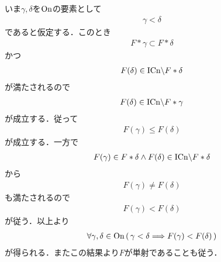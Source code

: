 	\begin{prf}
		いま$\gamma,\delta$を$\mathrm{On}$の要素として
		\begin{align}
			\gamma < \delta
		\end{align}
		であると仮定する．このとき
		\begin{align}
			F \ast \gamma \subset F \ast \delta
		\end{align}
		かつ
		\begin{align}
			F(\delta) \in \mathrm{ICn} \backslash F \ast \delta
		\end{align}
		が満たされるので
		\begin{align}
			F(\delta) \in \mathrm{ICn} \backslash F \ast \gamma
		\end{align}
		が成立する．従って
		\begin{align}
			F(\gamma) \leq F(\delta)
		\end{align}
		が成立する．一方で
		\begin{align}
			F(\gamma) \in F \ast \delta \wedge
			F(\delta) \in \mathrm{ICn} \backslash F \ast \delta
		\end{align}
		から
		\begin{align}
			F(\gamma) \neq F(\delta)
		\end{align}
		も満たされるので
		\begin{align}
			F(\gamma) < F(\delta)
		\end{align}
		が従う．以上より
		\begin{align}
			\forall \gamma, \delta \in \mathrm{On}\, (\, \gamma < \delta \Longrightarrow F(\gamma) < F(\delta)\, )
		\end{align}
		が得られる．またこの結果より$F$が単射であることも従う．
	\end{prf}